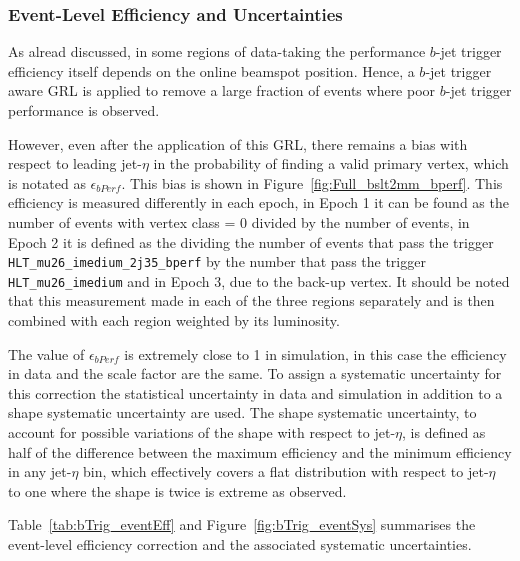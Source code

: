 \FloatBarrier
\newpage

\subsubsection{Event-Level Efficiency and Uncertainties}
\label{sec:trig-eventLevelEff}

As alread discussed, in some regions of data-taking the performance
$b$-jet trigger efficiency itself
depends on the online beamspot position.
Hence, a $b$-jet trigger aware GRL is applied to remove a large fraction of
events where poor $b$-jet trigger performance is observed.

However, even after the application of this GRL,
there remains a bias with respect to leading jet-$\eta$ in the
probability of finding a valid primary vertex, which is notated as $\epsilon_{bPerf}$.
This bias is shown in Figure~\ref{fig:Full_bslt2mm_bperf}.
This efficiency is measured differently in each epoch,
in Epoch 1 it can be found as the number of events with vertex class = 0 divided by the number of events,
in Epoch 2 it is defined as the dividing the number of events that pass the trigger
\verb|HLT_mu26_imedium_2j35_bperf| by the number that pass the trigger \verb|HLT_mu26_imedium|
and in Epoch 3, due to the back-up vertex.
It should be noted that this measurement made in each of the three regions separately and is then combined with each region weighted by its luminosity.

The value of $\epsilon_{bPerf}$ is extremely close to 1 in simulation, in this case the efficiency in data and the scale factor are the same.
To assign a systematic uncertainty for this correction the statistical uncertainty in data and simulation in addition to a shape systematic uncertainty are used.
The shape systematic uncertainty, to account for possible variations of the shape with respect to jet-$\eta$,
is defined as half of the difference between the maximum efficiency and the minimum efficiency in any jet-$\eta$ bin,
which effectively covers a flat distribution with respect to jet-$\eta$ to one where the shape is twice is extreme as observed.

Table~\ref{tab:bTrig_eventEff} and Figure~\ref{fig:bTrig_eventSys}
summarises the event-level efficiency correction and the associated systematic uncertainties.


